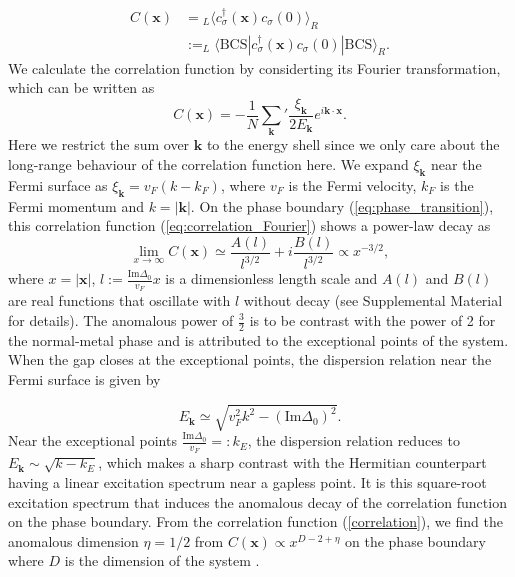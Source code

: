 \documentclass[aps,prl,twocolumn,nofootinbib,superscriptaddress,notitlepage,longbibliography]{revtex4-1}
\begin{document}
	\begin{align}
	C(\bm{x})&={}_{L}\langle c_{\sigma}^{\dagger}(\bm{x})c_{\sigma}(0)\rangle_{R}\nonumber\\
	&:=_{L}\langle\text{BCS}|c_{\sigma}^{\dagger}(\bm{x})c_{\sigma}(0)|\text{BCS}\rangle_{R}.
	\end{align}
 We calculate the correlation function by considerting its Fourier transformation, which can be written as
 \begin{equation}
 	C (\bm{x}) = -\frac{1}{N}\sum_{\bm{k}}^{}{'} \frac{\xi_{\bm{k}}}{2 E_{\bm{k}}} e^{i\bm{k} \cdot \bm{x}}.\label{eq:correlation_Fourier}
 \end{equation}
  Here we restrict the sum over $\bm{k}$ to the energy shell since we only care about the long-range behaviour of the correlation function here. We expand $\xi_{\bm{k}}$ near the Fermi surface as $\xi_{{\bm{k}}}=v_F(k-k_F)$, where $v_F$ is the Fermi velocity, $k_F$ is the Fermi momentum and $k=|\bm{k}|$. On the phase boundary (\ref{eq:phase_transition}), this correlation function (\ref{eq:correlation_Fourier}) shows a power-law decay as
	\begin{equation}
	\lim_{x\rightarrow\infty}C (\bm{x})\simeq\frac{A(l)}{l^{3/2}}+i\frac{B(l)}{l^{3/2}}\propto x^{-3/2},\label{correlation}
	\end{equation}
	where $x=|\bm{x}|$, $l:=\frac{\text{Im}\Delta_{0}}{v_{F}}x$ is a dimensionless length scale and $A(l)$ and $B(l)$ are real functions  that oscillate with $l$ without decay (see Supplemental Material \cite{SupplementaryMaterial} for details). The anomalous power of $\frac{3}{2}$ is to be contrast with the power of 2 for the normal-metal phase \cite{Sachdev:2011uj} and is attributed to the exceptional points of the system.  When the gap closes at the exceptional points, the dispersion relation near the Fermi surface is given by
	
	\begin{equation}
	E_{\bm{k}}\simeq\sqrt{v_{F}^{2}k^{2}-(\text{Im}\Delta_{0})^{2}}.
	\end{equation}
	Near the exceptional points $\frac{\text{Im}\Delta_{0}}{v_{F}}=:k_{E}$,
	the dispersion relation reduces to $E_{\bm{k}}\sim\sqrt{k-k_{E}}$,
	which makes a sharp contrast with the Hermitian counterpart having a
	linear excitation spectrum near a gapless point. It is this square-root
	excitation spectrum that induces the
	anomalous decay of the correlation function on the phase boundary. From the correlation function (\ref{correlation}), we find the anomalous dimension $\eta=1/2$ from $C(\bm{x})\propto x^{D-2+\eta}$ on the phase boundary where $D$ is the dimension of the system \cite{Sachdev:2011uj}.
	
\end{document}
